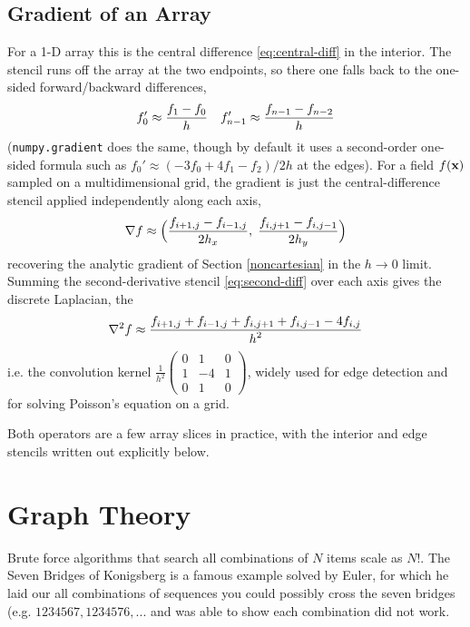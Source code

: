 \subsection{Gradient of an Array}
For a 1-D array this is the central difference \eqref{eq:central-diff} in the
interior. The stencil runs off the array at the two endpoints, so there one falls
back to the one-sided forward/backward differences,
\begin{align}
    f_0' \approx \frac{\displaystyle f_1 - f_0}{\displaystyle h} && f_{n-1}' \approx \frac{\displaystyle f_{n-1} - f_{n-2}}{\displaystyle h}
\end{align}
(\texttt{numpy.gradient} does the same, though by default it uses a second-order
one-sided formula such as $f_0' \approx (-3f_0 + 4f_1 - f_2)/2h$ at the edges). For a field $f(\textbf{x})$
sampled on a multidimensional grid, the gradient is just the central-difference
stencil applied independently along each axis,
\begin{align}
    \nabla f \approx \Big(\frac{\displaystyle f_{i+1,j}-f_{i-1,j}}{\displaystyle 2h_x},\;
                          \frac{\displaystyle f_{i,j+1}-f_{i,j-1}}{\displaystyle 2h_y}\Big)
\end{align}
recovering the analytic gradient of Section \ref{noncartesian} in the
$h\to 0$ limit. Summing the second-derivative stencil \eqref{eq:second-diff} over
each axis gives the discrete Laplacian, the 
\begin{align}
    \nabla^2 f \approx \frac{\displaystyle f_{i+1,j}+f_{i-1,j}+f_{i,j+1}+f_{i,j-1}-4f_{i,j}}{\displaystyle h^2}
\end{align}
i.e. the convolution kernel
$\frac{1}{h^2}\left(\begin{smallmatrix} 0&1&0\\ 1&-4&1\\ 0&1&0 \end{smallmatrix}\right)$,
widely used for edge detection and for solving Poisson's equation on a grid.

Both operators are a few array slices in practice, with the interior and edge
stencils written out explicitly below.


\section{Graph Theory}
Brute force algorithms that search all combinations of $N$ items scale as $N!$. The Seven Bridges of Konigsberg is a famous example solved by Euler, for which he laid our all combinations of sequences you could possibly cross the seven bridges (e.g. $1234567, 1234576,...$ and was able to show each combination did not work.


